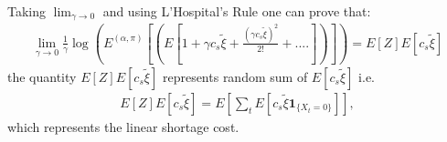 \begin{appendix}
\begin{align}
\end{align}
Taking $\lim_{\gamma\rightarrow 0 }$ and using L'Hospital's Rule one can prove that:
\begin{align}
\lim_{\gamma\rightarrow 0 }\frac{1}{\gamma}\log(E^{(\alpha,\pi)}[(E[1 + \gamma c_s \tilde{\xi} + \frac{(\gamma c_s \tilde{\xi})^2}{2!} + ....])]) = E[Z]E[c_s\tilde{\xi}]
\end{align}
the quantity $E[Z]E[c_s\tilde{\xi}] $ represents random sum of $E[c_s\tilde{\xi}]$ i.e.
\begin{align}
E[Z]E[c_s\tilde{\xi}] = E[\sum_t E[c_s \tilde{\xi}\mathbf{1}_{\lbrace X_t = 0\rbrace}]],
\end{align}
which represents the linear shortage cost.
\end{appendix}